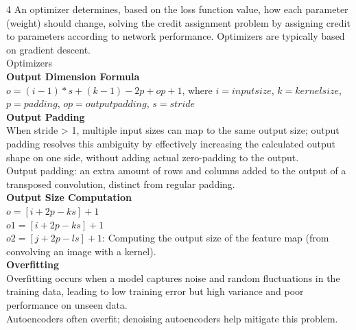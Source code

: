 \documentclass[8pt]{extarticle}
\begin{document}
\begin{multicols}{4}
An optimizer determines, based on the loss function value, how each parameter (weight) should change, solving the credit assignment problem by assigning credit to parameters according to network performance. Optimizers are typically based on gradient descent.\\
Optimizers\\
\vspace{2pt}\textbf{Output Dimension Formula}\\
$o = (i - 1) * s + (k - 1) - 2p + op + 1$, where $ i = input size$, $ k = kernel size$, $ p = padding$, $ op = output padding$, $ s = stride$\\
\vspace{2pt}\textbf{Output Padding}\\
When stride > 1, multiple input sizes can map to the same output size; output padding resolves this ambiguity by effectively increasing the calculated output shape on one side, without adding actual zero-padding to the output.\\
Output padding: an extra amount of rows and columns added to the output of a transposed convolution, distinct from regular padding.\\
\vspace{2pt}\textbf{Output Size Computation}\\
$o = [i + 2p - k s ] + 1$\\
$o1 = [i + 2p - k s ] + 1$\\
$o2 = [j + 2p - l s ] + 1$\Theorem: Computing the output size of the feature map (from convolving an image with a kernel).\\
\vspace{2pt}\textbf{Overfitting}\\
Overfitting occurs when a model captures noise and random fluctuations in the training data, leading to low training error but high variance and poor performance on unseen data.\\
Autoencoders often overfit; denoising autoencoders help mitigate this problem.\\


\end{multicols}
\end{document}
